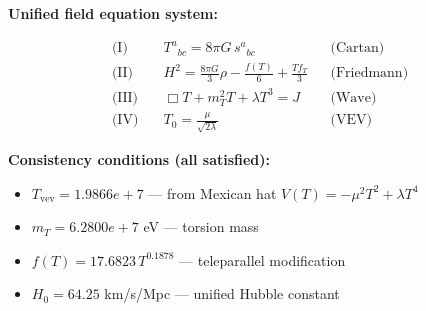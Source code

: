 
\textbf{Unified field equation system:}

\begin{align}
  \text{(I)} \quad & T^a{}_{bc} = 8\pi G \, s^a{}_{bc} && \text{(Cartan)} \\
  \text{(II)} \quad & H^2 = \frac{8\pi G}{3}\rho - \frac{f(T)}{6} + \frac{Tf_T}{3} && \text{(Friedmann)} \\
  \text{(III)} \quad & \Box T + m_T^2 T + \lambda T^3 = J && \text{(Wave)} \\
  \text{(IV)} \quad & T_0 = \frac{\mu}{\sqrt{2\lambda}} && \text{(VEV)}
\end{align}

\textbf{Consistency conditions (all satisfied):}
\begin{itemize}
  \item $T_{\text{vev}} = 1.9866e+7$ — from Mexican hat $V(T) = -\mu^2 T^2 + \lambda T^4$
  \item $m_T = 6.2800e+7$ eV — torsion mass
  \item $f(T) = 17.6823 \, T^{0.1878}$ — teleparallel modification
  \item $H_0 = 64.25$ km/s/Mpc — unified Hubble constant
\end{itemize}